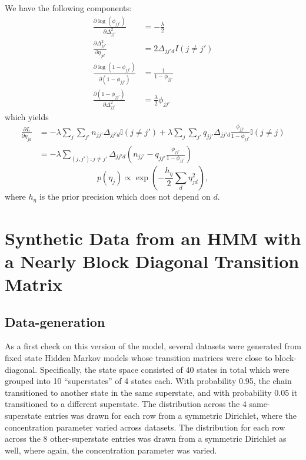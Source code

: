 We have the following components:
\begin{align*}
  \frac{\partial \log(\phi_{jj'})}{\partial \Delta_{jj'}^2} &=
  -\frac{\lambda}{2} \\
  \frac{\partial \Delta_{jj'}^2}{\partial \eta_{jd}} &= 2\Delta_{jj'd} I(j \neq j')\\
  \frac{\partial \log(1 - \phi_{jj'})}{\partial (1 -
    \phi_{jj'})} &= \frac{1}{1 - \phi_{jj'}} \\
  \frac{\partial (1 - \phi_{jj'})}{\partial
    \Delta_{jj'}^2} &= \frac{\lambda}{2} \phi_{jj'}
\end{align*}
which yields
\begin{align*}
  \frac{\partial L}{\partial \eta_{jd}} &= -\lambda \sum_{j}
  \sum_{j'} n_{jj'} \Delta_{jj'd} \mathbb{I}(j \neq j') +
  \lambda \sum_{j}\sum_{j'} q_{jj'} \Delta_{jj'd} \frac{\phi_{jj'}}{1 -
    \phi_{jj'}} \mathbb{I}(j \neq j) \\
  &= - \lambda \sum_{(j,j'): j \neq j'} \Delta_{jj'd} \left(n_{jj'} - q_{jj'}
    \frac{\phi_{jj'}}{1 - \phi_{jj'}}\right)
\end{align*}
\begin{equation*}
  p(\eta_j) \propto \exp\left(-\frac{h_\eta}{2} \sum_{d} \eta_{jd}^2 \right),
\end{equation*}
where $h_{\eta}$ is the prior precision which does not depend on $d$.

\section{Synthetic Data from an HMM with a Nearly Block Diagonal Transition Matrix}
\label{sec:synthetic-data-from}


\subsection{Data-generation}

As a first check on this version of the model, several datasets were generated from fixed state Hidden Markov models whose transition matrices were close to block-diagonal.  Specifically, the state space consisted of 40 states in total which were grouped into 10 ``superstates'' of 4 states each.  With probability 0.95, the chain transitioned to another state in the same superstate, and with probability 0.05 it transitioned to a different superstate.  The distribution across the 4 same-superstate entries was drawn for each row from a symmetric Dirichlet, where the concentration parameter varied across datasets.  The distribution for each row across the 8 other-superstate entries was drawn from a symmetric Dirichlet as well, where again, the concentration parameter was varied.

